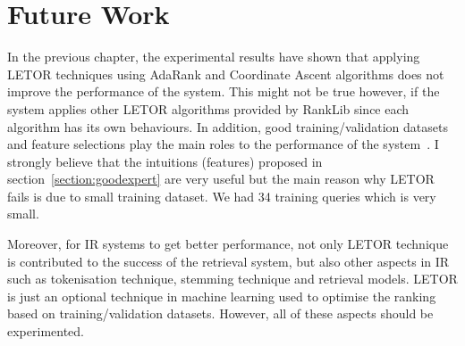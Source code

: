 \section{Future Work}
In the previous chapter, the experimental results have shown that applying LETOR techniques using AdaRank and Coordinate Ascent algorithms 
does not improve the performance
of the system. This might not be true however, if the system applies other LETOR algorithms provided by RankLib since each algorithm has its own behaviours.
In addition, good training/validation datasets and feature selections play the main roles to the performance of the system~\cite{craig}. I strongly believe that the intuitions (features)
proposed in section~\ref{section:goodexpert} are very useful but the main reason why LETOR fails is due to small training dataset. 
We had 34 training queries which is very small. 

Moreover, for IR systems to get better performance, not only LETOR technique is contributed to the success of the retrieval system, but also 
other aspects in IR such as tokenisation technique, stemming technique and retrieval models.
LETOR is just an optional technique in machine learning used to optimise the ranking based 
on training/validation datasets. However, all of these aspects should be experimented.
